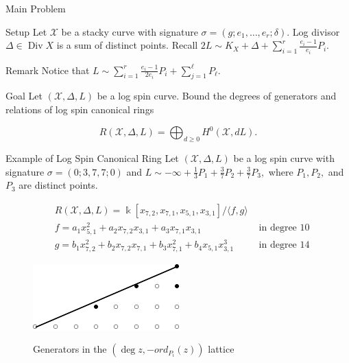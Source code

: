 \documentclass{beamer}
\theoremstyle{remark}
\newcommand \sx{{\mathscr X}}
\DeclareMathOperator\di{Div}
\newcommand{\halfcan}{L}
\newcommand\Bk{{\Bbbk}}
\begin{document}
\begin{frame}{Main Problem}
\begin{block}{Setup}
Let $\sx$ be a stacky curve with
signature $\sigma = (g; e_1, \ldots, e_r; \delta)$.
Log divisor $\Delta \in \di X$ is a sum of distinct points.
Recall $2 \halfcan \sim K_X + \Delta + \sum_{i = 1}^{r}
\frac{e_i - 1}{e_i} P_i$.
\end{block}

\begin{block}{Remark}
Notice that $\halfcan \sim \sum_{i = 1}^{r} \frac{e_i - 1}{2e_i} P_i
+ \sum_{j = 1}^{\ell} P_\ell$.
\end{block}

\begin{block}{Goal}
Let $(\sx, \Delta, \halfcan)$ be a log spin curve.
Bound the degrees of generators and relations of log spin
canonical rings

\[
	R(\sx, \Delta, \halfcan) = \bigoplus_{d \geq 0} H^0(\sx, d \halfcan).
\]
\end{block}
\end{frame}

\begin{frame}{Example of Log Spin Canonical Ring}
Let $(\sx, \Delta, \halfcan)$ be a log spin curve with signature $\sigma =
(0; 3, 7, 7; 0)$ and $\halfcan \sim -\infty + \frac{1}{3} P_1 +
\frac{3}{7} P_2 + \frac{3}{7} P_3,$ where $P_1, P_2,$ and $P_3$ are
distinct points.

\vspace*{-0.5cm}
\begin{align*}
	&R(\sx, \Delta, \halfcan) = \Bk[x_{7, 2}, x_{7, 1}, x_{5, 1}, x_{3, 1}] / \langle f, g \rangle \\
	&f = a_1 x_{5, 1}^2 + a_2 x_{7, 2} x_{3, 1} + a_3 x_{7, 1} x_{3, 1} 
	&\text{ in degree $10$} \\
	&g = b_1 x_{7, 2}^2 + b_2 x_{7, 2} x_{7, 1} + b_3 x_{7, 1}^2
	+ b_4 x_{5, 1} x_{3, 1}^3  &\text{ in degree $14$}
\end{align*}

\begin{figure}
\includegraphics{pics/spin-377-pic-pics.pdf} \\
\caption{Generators in the $(\deg z, -ord_{P_i}(z))$ lattice}
\end{figure}

\end{frame}
\end{document}
